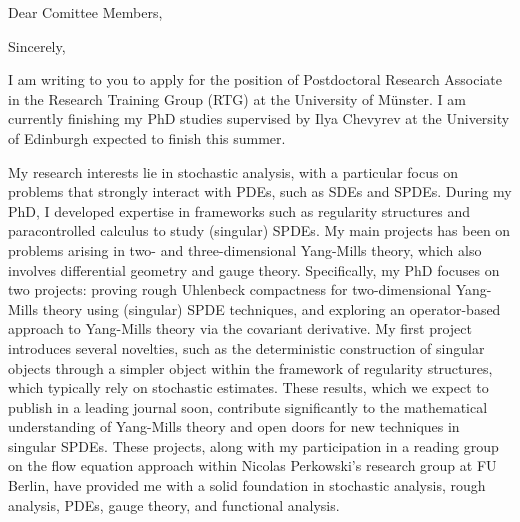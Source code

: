 \documentclass[12pt,a4paper]{moderncv}
\begin{document}
\date{\today}
\opening{Dear Comittee Members,}
\closing{Sincerely,\vspace{0em}}


\makelettertitle
\justifying
I am writing to you to apply for the position of Postdoctoral Research Associate in the Research Training Group (RTG) at the University of Münster. I am currently finishing my PhD studies supervised by Ilya Chevyrev at the University of Edinburgh expected to finish this summer. %

My research interests lie in stochastic analysis, with a particular focus on problems that strongly interact with PDEs, such as SDEs and SPDEs. During my PhD, I developed expertise in frameworks such as regularity structures and paracontrolled calculus to study (singular) SPDEs. My main projects has been on problems arising in two- and three-dimensional Yang-Mills theory, which also involves differential geometry and gauge theory. Specifically, my PhD focuses on two projects: proving rough Uhlenbeck compactness for two-dimensional Yang-Mills theory using (singular) SPDE techniques, 
 and exploring an operator-based approach to Yang-Mills theory via the covariant derivative. %
%
My first project introduces several novelties, such as the deterministic construction of singular objects through a simpler object within the framework of regularity structures, which typically rely on stochastic estimates. These results, which we expect to publish in a leading journal soon, contribute significantly to the mathematical understanding of Yang-Mills theory and open doors for new techniques in singular SPDEs.
%
These projects, along with my participation in a reading group on the flow equation approach within Nicolas Perkowski’s research group at FU Berlin, have provided me with a solid foundation in stochastic analysis, rough analysis, PDEs, gauge theory, and functional analysis.
\end{document}
